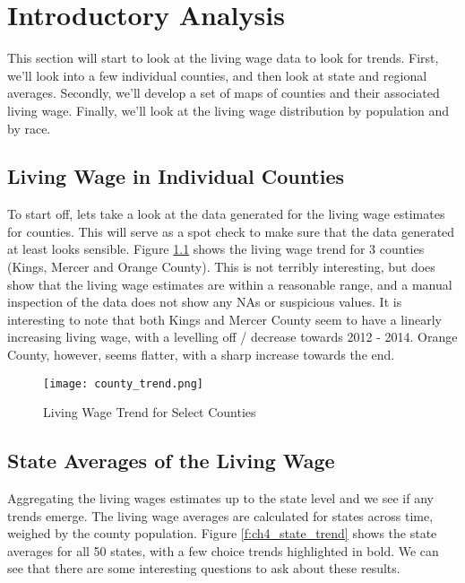 \chapter{Introductory Analysis}\label{ch:intro_analysis}

This section will start to look at the living wage data to look for trends. First, we'll look into a few individual counties, and then look at state and regional averages. Secondly, we'll develop a set of maps of counties and their associated living wage. Finally, we'll look at the living wage distribution by population and by race.

\section{Living Wage in Individual Counties}

To start off, lets take a look at the data generated for the living wage estimates for counties. This will serve as a spot check to make sure that the data generated at least looks sensible. Figure \ref{f:ch4_individual} shows the living wage trend for 3 counties (Kings, Mercer and Orange County). This is not terribly interesting, but does show that the living wage estimates are within a reasonable range, and a manual inspection of the data does not show any NAs or suspicious values. It is interesting to note that both Kings and Mercer County seem to have a linearly increasing living wage, with a levelling off / decrease towards 2012 - 2014. Orange County, however, seems flatter, with a sharp increase towards the end.

\begin{figure}[H]
    \centering
        \texttt{[image: county\_trend.png]}
        \caption{Living Wage Trend for Select Counties}
    \label{f:ch4_individual}
\end{figure}


\section{State Averages of the Living Wage}

Aggregating the living wages estimates up to the state level and we see if any trends emerge. The living wage averages are calculated for states across time, weighed by the county population. Figure \ref{f:ch4_state_trend} shows the state averages for all 50 states, with a few choice trends highlighted in bold. We can see that there are some interesting questions to ask about these results.

